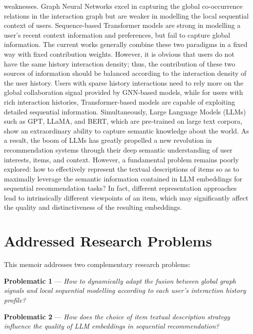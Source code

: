 \documentclass[12pt,a4paper]{report}
\begin{document}
weaknesses. Graph Neural Networks excel in capturing the global co-occurrence
relations in the interaction graph but are weaker in modelling the local
sequential context of users. Sequence-based Transformer models are strong in
modelling a user's recent context information and preferences, but fail to
capture global information.
The current works generally combine these two paradigms in a fixed way with
fixed contribution weights. However, it is obvious that users do not have the
same history interaction density; thus, the contribution of these two sources
of information should be balanced according to the interaction density of the
user history. Users with sparse history interactions need to rely more on the
global collaboration signal provided by GNN-based models, while for users with
rich interaction histories, Transformer-based models are capable of exploiting
detailed sequential information.
Simultaneously, Large Language Models (LLMs) such as GPT, LLaMA, and BERT,
which are pre-trained on large text corpora, show an extraordinary ability to
capture semantic knowledge about the world. As a result, the boom of LLMs has
greatly propelled a new revolution in recommendation systems through their deep
semantic understanding of user interests, items, and context. However, a
fundamental problem remains poorly explored: how to effectively represent the
textual descriptions of items so as to maximally leverage the semantic
information contained in LLM embeddings for sequential recommendation tasks?
In fact, different representation approaches lead to intrinsically different
viewpoints of an item, which may significantly affect the quality and
distinctiveness of the resulting embeddings.

\section*{Addressed Research Problems}

This memoir addresses two complementary research problems:

\medskip
\noindent\textbf{Problematic 1} --- \textit{How to dynamically adapt the
fusion between global graph signals and local sequential modelling according
to each user's interaction history profile?}

\medskip
\noindent\textbf{Problematic 2} --- \textit{How does the choice of item
textual description strategy influence the quality of LLM embeddings in
sequential recommendation?}
\end{document}
